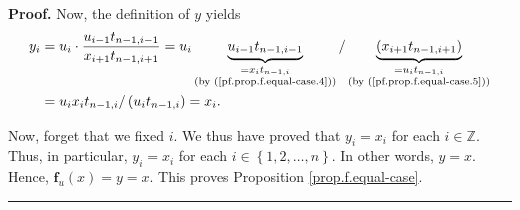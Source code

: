 \documentclass[numbers=enddot,12pt,final,onecolumn,notitlepage]{scrartcl}%
\theoremstyle{definition}
\newenvironment{proof}[1][Proof]{\noindent\textbf{#1.} }{\ \rule{0.5em}{0.5em}}
\newenvironment{verlong}{}{}
\begin{document}
\begin{proof}
\begin{verlong}
Now, the definition of $y$ yields%
\begin{align*}
y_{i}  &  =u_{i}\cdot\dfrac{u_{i-1}t_{n-1,i-1}}{x_{i+1}t_{n-1,i+1}}%
=u_{i}\underbrace{u_{i-1}t_{n-1,i-1}}_{\substack{=x_{i}t_{n-1,i}\\\text{(by
(\ref{pf.prop.f.equal-case.4}))}}}/\underbrace{\left(  x_{i+1}t_{n-1,i+1}%
\right)  }_{\substack{=u_{i}t_{n-1,i}\\\text{(by (\ref{pf.prop.f.equal-case.5}%
))}}}\\
&  =u_{i}x_{i}t_{n-1,i}/\left(  u_{i}t_{n-1,i}\right)  =x_{i}.
\end{align*}

\end{verlong}

Now, forget that we fixed $i$. We thus have proved that $y_{i}=x_{i}$ for each
$i\in\mathbb{Z}$. Thus, in particular, $y_{i}=x_{i}$ for each $i\in\left\{
1,2,\ldots,n\right\}  $. In other words, $y=x$. Hence, $\mathbf{f}_{u}\left(
x\right)  =y=x$. This proves Proposition \ref{prop.f.equal-case}.
\end{proof}
\end{document}
